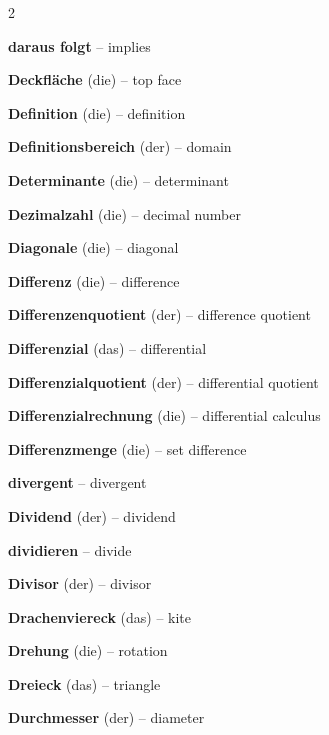 \begin{multicols}{2}
\par\nopagebreak
\textbf{daraus folgt} -- implies\dotfill\hyperref[e:350]{\pageref*{e:350}}\par
\textbf{Deckfläche} (die) -- top face\dotfill\hyperref[e:249]{\pageref*{e:249}}\par
\textbf{Definition} (die) -- definition\dotfill\hyperref[e:346]{\pageref*{e:346}}\par
\textbf{Definitionsbereich} (der) -- domain\dotfill\hyperref[e:109]{\pageref*{e:109}}\par
\textbf{Determinante} (die) -- determinant\dotfill\hyperref[e:325]{\pageref*{e:325}}\par
\textbf{Dezimalzahl} (die) -- decimal number\dotfill\hyperref[e:13]{\pageref*{e:13}}\par
\textbf{Diagonale} (die) -- diagonal\dotfill\hyperref[e:197]{\pageref*{e:197}}\par
\textbf{Differenz} (die) -- difference\dotfill\hyperref[e:18]{\pageref*{e:18}}\par
\textbf{Differenzenquotient} (der) -- difference quotient\dotfill\hyperref[e:272]{\pageref*{e:272}}\par
\textbf{Differenzial} (das) -- differential\dotfill\hyperref[e:276]{\pageref*{e:276}}\par
\textbf{Differenzialquotient} (der) -- differential quotient\dotfill\hyperref[e:275]{\pageref*{e:275}}\par
\textbf{Differenzialrechnung} (die) -- differential calculus\dotfill\hyperref[e:274]{\pageref*{e:274}}\par
\textbf{Differenzmenge} (die) -- set difference\dotfill\hyperref[e:102]{\pageref*{e:102}}\par
\textbf{divergent} -- divergent\dotfill\hyperref[e:263]{\pageref*{e:263}}\par
\textbf{Dividend} (der) -- dividend\dotfill\hyperref[e:26]{\pageref*{e:26}}\par
\textbf{dividieren} -- divide\dotfill\hyperref[e:24]{\pageref*{e:24}}\par
\textbf{Divisor} (der) -- divisor\dotfill\hyperref[e:27]{\pageref*{e:27}}\par
\textbf{Drachenviereck} (das) -- kite\dotfill\hyperref[e:203]{\pageref*{e:203}}\par
\textbf{Drehung} (die) -- rotation\dotfill\hyperref[e:174]{\pageref*{e:174}}\par
\textbf{Dreieck} (das) -- triangle\dotfill\hyperref[e:177]{\pageref*{e:177}}\par
\textbf{Durchmesser} (der) -- diameter\dotfill\hyperref[e:214]{\pageref*{e:214}}\par


\end{multicols}
